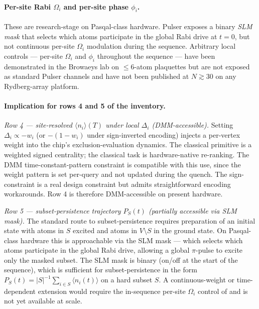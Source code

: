 \documentclass[10pt]{article}
\begin{document}
\paragraph{Per-site Rabi $\Omega_i$ and per-site phase $\phi_i$.}
These are research-stage on Pasqal-class hardware. Pulser exposes a binary \emph{SLM mask} that selects which atoms participate in the global Rabi drive at $t = 0$, but not continuous per-site $\Omega_i$ modulation during the sequence. Arbitrary local controls --- per-site $\Omega_i$ and $\phi_i$ throughout the sequence --- have been demonstrated in the Browaeys lab on $\leq 6$-atom plaquettes \cite{bornet2024arbitrary} but are not exposed as standard Pulser channels and have not been published at $N \gtrsim 30$ on any Rydberg-array platform.

\paragraph{Implication for rows 4 and 5 of the inventory.}

\emph{Row 4 --- site-resolved $\langle n_i\rangle(T)$ under local $\Delta_i$ (DMM-accessible).}
Setting $\Delta_i \propto -w_i$ (or $-(1-w_i)$ under sign-inverted encoding) injects a per-vertex weight into the chip's exclusion-evaluation dynamics. The classical primitive is a weighted signed centrality; the classical task is hardware-native re-ranking. The DMM time-constant-pattern constraint is compatible with this use, since the weight pattern is set per-query and not updated during the quench. The sign-constraint is a real design constraint but admits straightforward encoding workarounds. Row 4 is therefore DMM-accessible on present hardware.

\emph{Row 5 --- subset-persistence trajectory $P_S(t)$ (partially accessible via SLM mask).}
The standard route to subset-persistence requires preparation of an initial state with atoms in $S$ excited and atoms in $V \setminus S$ in the ground state. On Pasqal-class hardware this is approachable via the SLM mask --- which selects which atoms participate in the global Rabi drive, allowing a global $\pi$-pulse to excite only the masked subset. The SLM mask is binary (on/off at the start of the sequence), which is sufficient for subset-persistence in the form $P_S(t) = |S|^{-1} \sum_{i \in S} \langle n_i(t)\rangle$ on a hard subset $S$. A continuous-weight or time-dependent extension would require the in-sequence per-site $\Omega_i$ control of \cite{bornet2024arbitrary} and is not yet available at scale.
\end{document}
